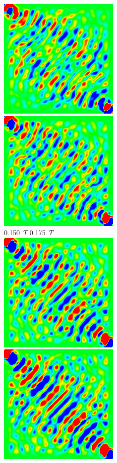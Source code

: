 \documentclass[a4j, twocolumn]{jsarticle}
\begin{document}
\begin{figure}
\includegraphics[width=0.4\hsize]{./figures/capture/sqr/sinsqr128_32i_l_dif_7067} \ 
\includegraphics[width=0.4\hsize]{./figures/capture/sqr/sinsqr128_32i_l_dif_7068} \\
0.150\ $T$ \hspace*{0.25\hsize} 0.175\ $T$  \vspace{5pt}\\
\includegraphics[width=0.4\hsize]{./figures/capture/sqr/sinsqr128_32i_l_dif_7069} \ 
\includegraphics[width=0.4\hsize]{./figures/capture/sqr/sinsqr128_32i_l_dif_7070} \\

\end{figure}
\end{document}
